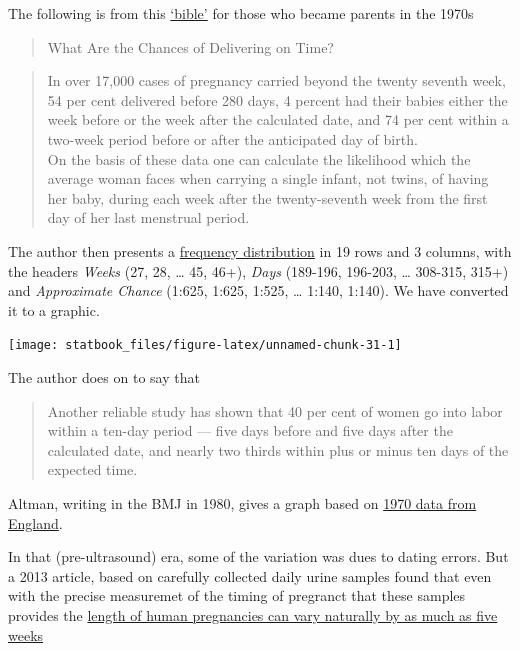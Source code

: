 \documentclass[]{book}
\begin{document}
The following is from this \href{http://www.biostat.mcgill.ca/hanley/statbook/Guttmacher.pdf}{`bible'} for those who became parents in the 1970s

\begin{quote}
What Are the Chances of Delivering on Time?
\end{quote}

\begin{quote}
In over 17,000 cases of pregnancy carried beyond the twenty seventh week, 54 per cent delivered before 280 days, 4 percent had their babies either the week before or the week after the calculated date, and 74 per cent within a two-week period before or after the anticipated day of birth.\\
On the basis of these data one can calculate the likelihood
which the average woman faces when carrying a single infant,
not twins, of having her baby, during each week after the
twenty-seventh week from the first day of her last menstrual
period.
\end{quote}

The author then presents a \href{http://www.biostat.mcgill.ca/hanley/statbook/Guttmacher.pdf\#page=7}{frequency distribution} in 19 rows and 3 columns, with the headers \emph{Weeks} (27, 28, \ldots{} 45, 46+), \emph{Days} (189-196, 196-203, \ldots{} 308-315, 315+) and \emph{Approximate Chance} (1:625, 1:625, 1:525, \ldots{} 1:140, 1:140). We have converted it to a graphic.

\begin{center}\texttt{[image: statbook\_files/figure-latex/unnamed-chunk-31-1]} \end{center}

The author does on to say that

\begin{quote}
Another reliable study has shown that 40 per cent of
women go into labor within a ten-day period --- five days before and five days after the calculated date, and nearly two thirds within plus or minus ten days of the expected time.
\end{quote}

Altman, writing in the BMJ in 1980, gives a graph based on \href{http://www.biostat.mcgill.ca/hanley/statbook/Altman1980.pdf\#page=2}{1970 data from
England}.

In that (pre-ultrasound) era, some of the variation was dues to dating errors. But a 2013 article, based on carefully collected daily urine samples found that even with the precise measuremet of the timing of pregranct that these samples provides the \href{https://www.sciencedaily.com/releases/2013/08/130806203327.htm}{length of human pregnancies can vary naturally by as much as five weeks}
\end{document}
